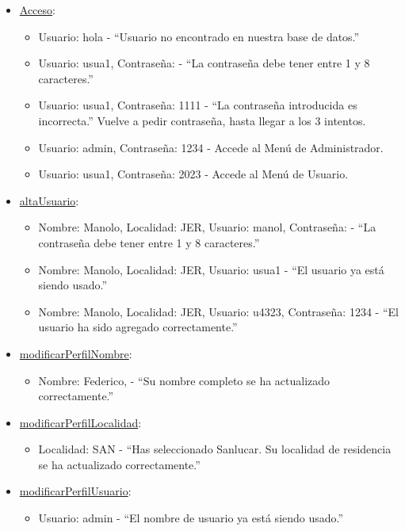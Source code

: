 \begin{itemize}
  \item \href{DOC_DOXYGEN/acceso_8c_source.html}{Acceso}:
  \begin{itemize}
    \item Usuario: hola - “Usuario no encontrado en nuestra base de datos.”
    \item Usuario: usua1, Contraseña: - “La contraseña debe tener entre 1 y 8 caracteres.”
    \item Usuario: usua1, Contraseña: 1111 - “La contraseña introducida es incorrecta.” Vuelve a pedir contraseña, hasta llegar a los 3 intentos.
    \item Usuario: admin, Contraseña: 1234 - Accede al Menú de Administrador.
    \item Usuario: usua1, Contraseña: 2023 - Accede al Menú de Usuario.
  \end{itemize}
  \item \href{DOC_DOXYGEN/escribir_8c_source.html}{altaUsuario}:
  \begin{itemize}
    \item Nombre: Manolo, Localidad: JER, Usuario: manol, Contraseña: - “La contraseña debe tener entre 1 y 8 caracteres.”
    \item Nombre: Manolo, Localidad: JER, Usuario: usua1 - “El usuario ya está siendo usado.”
    \item Nombre: Manolo, Localidad: JER, Usuario: u4323, Contraseña: 1234 - “El usuario ha sido agregado correctamente.”
  \end{itemize}
  \item \href{DOC_DOXYGEN/modificar_8c_source.html}{modificarPerfilNombre}:
  \begin{itemize}
    \item Nombre: Federico, - “Su nombre completo se ha actualizado correctamente.”
  \end{itemize}
  \item \href{DOC_DOXYGEN/modificar_8c_source.html}{modificarPerfilLocalidad}:
  \begin{itemize}
    \item Localidad: SAN - “Has seleccionado Sanlucar. Su localidad de residencia se ha actualizado correctamente.”
  \end{itemize}
  \item \href{DOC_DOXYGEN/modificar_8c_source.html}{modificarPerfilUsuario}:
  \begin{itemize}
    \item Usuario: admin - “El nombre de usuario ya está siendo usado.”

\end{itemize}
\end{itemize}
